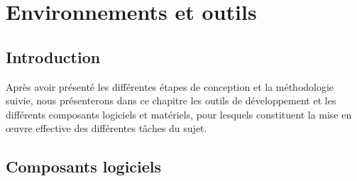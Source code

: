 \section{Environnements et outils}
\subsection*{Introduction}

Après avoir présenté les différentes étapes de conception et la méthodologie suivie, nous présenterons dans ce chapitre les outils de développement et les différents composants logiciels et matériels, pour lesquels constituent la mise en œuvre effective des différentes tâches du sujet.

\subsection{Composants logiciels}

